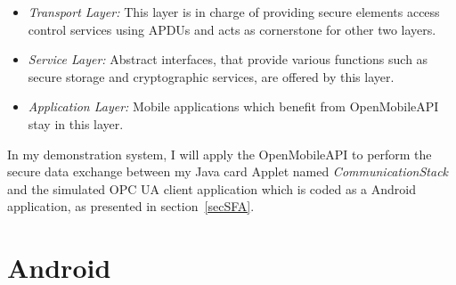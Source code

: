  \begin{itemize}
  \item \emph{Transport Layer:} This layer is in charge of providing secure elements access control services using APDUs and acts as cornerstone for other two layers.
  \item \emph{Service Layer:} Abstract interfaces, that provide various functions such as secure storage and cryptographic services, are offered by this layer.
  \item \emph{Application Layer:} Mobile applications which benefit from OpenMobileAPI stay in this layer.
\end{itemize}

In my demonstration system, I will apply the OpenMobileAPI to perform the secure data exchange between my Java card Applet named \emph{CommunicationStack} and the simulated OPC UA client application which is coded as a Android application, as presented in section~\ref{secSFA}.

\section{Android} \label{secAndroid}

